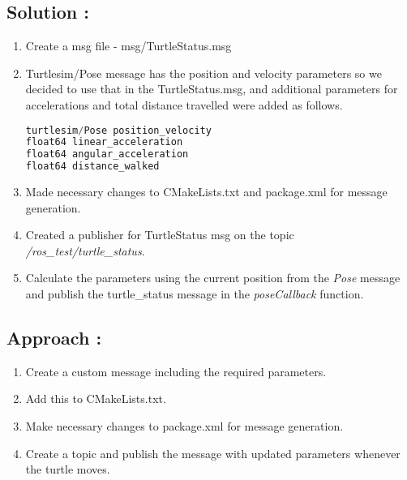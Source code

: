 \documentclass[12pt]{article}
\begin{document}
\subsection{Solution :}
\begin{enumerate}
\item Create a msg file - msg/TurtleStatus.msg
\item Turtlesim/Pose message has the position and velocity parameters so we decided to use that in the TurtleStatus.msg, and additional parameters for accelerations and total distance travelled were added as follows.
\begin{lstlisting}[language=c++]
turtlesim/Pose position_velocity
float64 linear_acceleration
float64 angular_acceleration
float64 distance_walked
\end{lstlisting}
\item Made necessary changes to CMakeLists.txt and package.xml for message generation.
\item Created a publisher for TurtleStatus msg on the topic \textit{/ros\_test/turtle\_status}.
\item Calculate the parameters using the current position from the \textit{Pose} message and publish the turtle\_status message in the \textit{poseCallback} function.
\end{enumerate}

\subsection{Approach :}
\begin{enumerate}
\item Create a custom message including the required parameters.
\item Add this to CMakeLists.txt.
\item Make necessary changes to package.xml for message generation.
\item Create a topic and publish the message with updated parameters whenever the turtle moves.
\end{enumerate}
\end{document}
